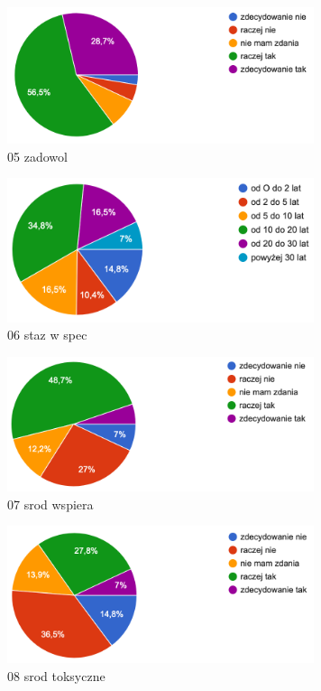 \documentclass[a4paper,12pt,twoside,openany]{report}
\begin{document}
\begin{figure}
    \includegraphics[width=9cm]{wyniki/05_zadowol}
    \caption{ 05 zadowol }
\end{figure}

\begin{figure}
    \includegraphics[width=9cm]{wyniki/06_staz_w_spec}
    \caption{ 06 staz w spec }
\end{figure}

\begin{figure}
    \includegraphics[width=9cm]{wyniki/07_srod_wspiera}
    \caption{ 07 srod wspiera }
\end{figure}

\begin{figure}
    \includegraphics[width=9cm]{wyniki/08_srod_toksyczne}
    \caption{ 08 srod toksyczne }
\end{figure}
\end{document}
